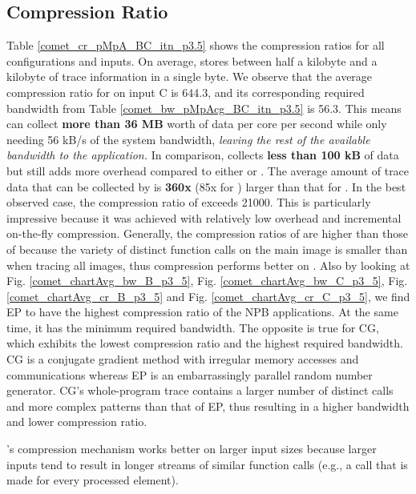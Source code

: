   
\subsection{Compression Ratio}
\label{subsec:cr}
Table \ref{comet_cr_pMpA_BC_itn_p3.5} shows the compression ratios for all configurations and inputs.
%
On average, \parlot stores between half a kilobyte and a kilobyte of trace information in a single byte. 
%
We observe that the
average compression ratio for \parlota on input C is 644.3, and its
corresponding required bandwidth from Table
\ref{comet_bw_pMpAcg_BC_itn_p3.5} is 56.3.
%
This means \parlot can
collect \textbf{more than 36 MB} worth of data per core per second
while only needing 56 kB/s of the system bandwidth, {\em leaving the rest of the available bandwidth to the application.}
%
In comparison, \callgrind
collects \textbf{less than 100 kB} of data but still adds more
overhead compared to either \parlota or \parlotm . 
%
The average amount of trace data that can be collected by \parlota is
\textbf{360x} (85x for \parlotm) larger than that for \callgrind.
%
In the best observed case, the compression ratio of
\parlot exceeds 21000.
%
This is particularly impressive because it was achieved with relatively low overhead and incremental  
on-the-fly compression.
%
Generally, the compression ratios of \parlotm are higher than those of \parlota because the variety of distinct function calls on the main image is smaller than when tracing all images, thus compression performs better on \parlotm. 
Also by looking at Fig. \ref{comet_chartAvg_bw_B_p3_5}, Fig. \ref{comet_chartAvg_bw_C_p3_5}, Fig. \ref{comet_chartAvg_cr_B_p3_5} and Fig. \ref{comet_chartAvg_cr_C_p3_5}, we find EP to have the highest compression ratio of the NPB applications. At the same time, it has the minimum required bandwidth. The opposite is true for CG, which exhibits the lowest compression ratio and the highest required bandwidth. CG is a conjugate gradient method with irregular memory accesses and communications whereas EP is an embarrassingly parallel random number generator. CG's whole-program trace contains a larger number of distinct calls and more complex patterns than that of EP, thus resulting in a higher bandwidth and lower compression ratio.
%

\parlot's compression mechanism works better on larger input sizes because larger inputs tend to result in longer streams of similar function calls (e.g., a call that is made for every processed element).
  

